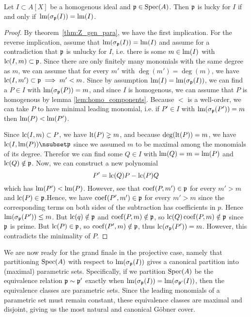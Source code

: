 \begin{theorem}\label{thm:homo_lucky_iff_lm}
  Let $I \subset A[X]$ be a homogenous ideal and $\mathfrak p \in \operatorname{Spec}(A)$. Then $\mathfrak p$ is lucky for $I$ if and only if $\,\operatorname{lm}(\sigma_{\mathfrak p}(I)) = \operatorname{lm}(I)$.
\end{theorem}
\begin{proof}
  By theorem~\ref{thm:Z_gen_para}, we have the first implication. For the reverse implication, assume that $\operatorname{lm}(\sigma_{\mathfrak p}(I)) = \operatorname{lm}(I)$ and assume for a contradiction that $\mathfrak p$ is unlucky for $I$, i.e. there is some $m \in \operatorname{lm}(I)$ with $\operatorname{lc}(I, m) \subset \mathfrak p$. Since there are only finitely many monomials with the same degree as $m$, we can assume that for every $m'$ with $\deg(m') = \deg(m)$, we have $\operatorname{lc}(I, m') \subset \mathfrak p \implies m' < m$. Since by assumption $\operatorname{lm}(I) = \operatorname{lm}(\sigma_{\mathfrak p}(I))$, we can find a $P \in I$ with $\operatorname{lm}(\sigma_{\mathfrak p}(P)) = m$, and since $I$ is homogenous, we can assume that $P$ is homogenous by lemma \ref{lem:homo_components}. Because $<$ is a well-order, we can take $P$ to have minimal leading monomial, i.e. if $P' \in I$ with $\operatorname{lm}(\sigma_{\mathfrak p}(P')) = m$ then $\operatorname{lm}(P) < \operatorname{lm}(P')$.

  Since $\operatorname{lc}(I, m) \subset P$, we have $\operatorname{lt}(P) \gneq m$, and because $\deg(\operatorname{lt}(P)) = m$, we have $\LC(I, \LM(P)) \nsubset \p$ since we assumed $m$ to be maximal among the monomials of its degree. Therefor we can find some $Q \in I$ with $\operatorname{lm}(Q) = m = \operatorname{lm}(P)$ and $\operatorname{lc}(Q) \notin \mathfrak p$. Now, we can construct a new polynomial
  \[P' = \operatorname{lc}(Q)P - \operatorname{lc}(P) Q\]
  which has $\operatorname{lm}(P') < \operatorname{lm}(P)$. However, see that $\operatorname{coef}(P, m') \in \mathfrak p$ for every $m' > m$ and $\operatorname{lc}(P) \in \mathfrak p$.Hence, we have $\operatorname{coef}(P', m') \in \mathfrak p$ for every $m' > m$ since the corresponding terms on both sides of the subtraction has coefficients in $p$. Hence $\operatorname{lm}(\sigma_{\mathfrak p}(P')) \leq m$. But $\operatorname{lc}(q) \notin \mathfrak p$ and $\operatorname{coef}(P, m) \notin \mathfrak p$, so $\operatorname{lc}(Q)\operatorname{coef}(P, m) \notin \mathfrak p$ since $\mathfrak p$ is prime. But $\operatorname{lc}(P) \in \mathfrak p$, so $\operatorname{coef}(P', m) \notin \mathfrak p$, thus $\operatorname{lc}(\sigma_{\mathfrak p}(P')) = m$. However, this contradicts the minimality of $P$.
\end{proof}

We are now ready for the grand finale in the projective case, namely that partitioning $\operatorname{Spec}(A)$ with respect to $\operatorname{lm}(\sigma_{\mathfrak p}(I))$ gives a canonical partition into (maximal) parametric sets. Specifically, if we partition $\operatorname{Spec}(A)$ be the equivalence relation $\mathfrak p \sim \mathfrak p'$ exactly when $\operatorname{lm}(\sigma_{\mathfrak p}(I)) = \operatorname{lm}(\sigma_{\mathfrak p'}(I))$, then the equivalence classes are parametric sets. Since the leading monomials of a parametric set must remain constant, these equivalence classes are maximal and disjoint, giving us the most natural and canonical Göbner cover.

